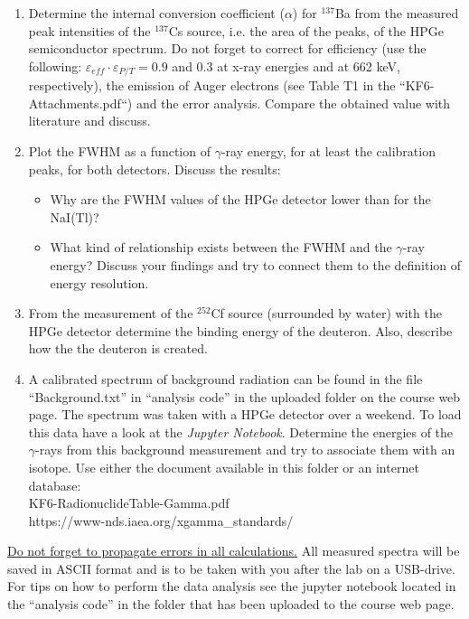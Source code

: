 \documentclass[12pt]{article}
\begin{document}
\begin{enumerate}
  \item Determine the internal conversion coefficient ($\alpha$) for $^{137}$Ba from the measured peak intensities of the $^{137}$Cs source, i.e. the area of the peaks, of the HPGe semiconductor spectrum. Do not forget to correct for efficiency (use the following: $\varepsilon_{eff} \cdot \varepsilon_{P/T} = 0.9$ and 0.3 at x-ray energies and at 662 keV, respectively), the emission of Auger electrons (see Table T1 in the ``KF6-Attachments.pdf``) and the error analysis. Compare the obtained value with literature and discuss.
  \item Plot the FWHM as a function of $\gamma$-ray energy, for at least the calibration peaks, for both detectors. Discuss the results:
    \begin{itemize}
      \item Why are the FWHM values of the HPGe detector lower than for the NaI(Tl)?
      \item What kind of relationship exists between the FWHM and the $\gamma$-ray energy? Discuss your findings and try to connect them to the definition of energy resolution.
    \end{itemize}
  \item From the measurement of the $^{252}$Cf source (surrounded by water) with the HPGe detector determine the binding energy of the deuteron. Also, describe how the the deuteron is created.
  \item A calibrated spectrum of background radiation can be found in the file ``Background.txt'' in ``analysis code'' in the uploaded folder on the course web page. The spectrum was taken with a HPGe detector over a weekend. To load this data have a look at the {\it Jupyter Notebook}. Determine the energies of the $\gamma$-rays from this background measurement and try to associate them with an isotope. Use either the document available in this folder or an internet database: \\
    KF6-RadionuclideTable-Gamma.pdf \\
    https://www-nds.iaea.org/xgamma\_standards/
\end{enumerate}

\underline{Do not forget to propagate errors in all calculations.} All measured spectra will be saved in ASCII format and is to be taken with you after the lab on a USB-drive. For tips on how to perform the data analysis see the jupyter notebook located in the ``analysis code'' in the folder that has been uploaded to the course web page.
\end{document}
